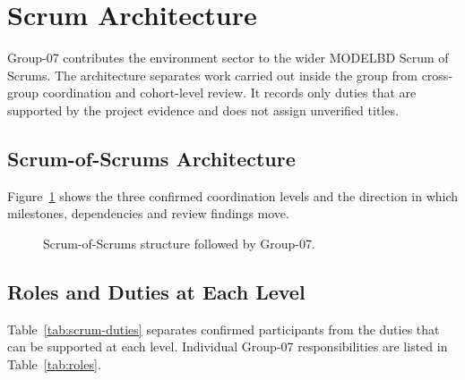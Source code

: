 \section{Scrum Architecture}
\label{sec:scrum}

Group-07 contributes the environment sector to the wider MODELBD Scrum of
Scrums. The architecture separates work carried out inside the group from
cross-group coordination and cohort-level review. It records only duties that
are supported by the project evidence and does not assign unverified titles.

\subsection{Scrum-of-Scrums Architecture}
\label{subsec:scrum-architecture}

Figure~\ref{fig:scrum-architecture} shows the three confirmed coordination
levels and the direction in which milestones, dependencies and review findings
move.

\begin{figure}[H]
\centering
{}
\caption{Scrum-of-Scrums structure followed by Group-07.}
\label{fig:scrum-architecture}
\end{figure}

\subsection{Roles and Duties at Each Level}
\label{subsec:scrum-duties}

Table~\ref{tab:scrum-duties} separates confirmed participants from the duties
that can be supported at each level. Individual Group-07 responsibilities are
listed in Table~\ref{tab:roles}.

